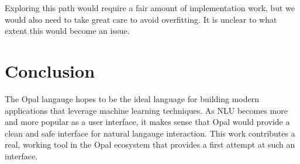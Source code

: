 \documentclass[twocolumn]{article}
\begin{document}
Exploring this path would require a fair amount of implementation work, but we
would also need to take great care to avoid overfitting. It is unclear to what
extent this would become an issue.

\section{Conclusion} \label{conclusion}
The Opal langauge hopes to be the ideal language for building modern
applications that leverage machine learning techniques. As NLU becomes more and
more popular as a user interface, it makes sense that Opal would provide a clean
and safe interface for natural langauge interaction. This work contributes a
real, working tool in the Opal ecosystem that provides a first attempt at such
an interface.
\end{document}
